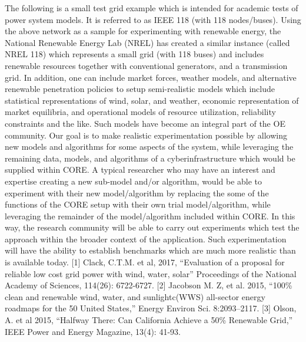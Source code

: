 The following is a small test grid example which is intended for academic tests of power system models. It is referred to as IEEE 118 (with 118 nodes/buses). Using the above network as a sample for experimenting with renewable energy, the National Renewable Energy Lab (NREL) has created a similar instance (called NREL 118) which represents a small grid (with 118 buses) and includes renewable resources together with conventional generators, and a transmission grid.  In addition, one can include market forces, weather models, and alternative renewable penetration policies to setup semi-realistic models which include statistical representations of wind, solar, and weather, economic representation of market equilibria, and operational models of resource utilization, reliability constraints and the like.  Such models have become an integral part of the OE community.  Our goal is to make realistic experimentation possible by allowing new models and algorithms for some aspects of the system, while leveraging the remaining data, models, and algorithms of a cyberinfrastructure which would be supplied within CORE.   A typical researcher who may  have an interest and expertise creating a new sub-model and/or algorithm, would be able to experiment with their new model/algorithm  by replacing the some of the functions of the CORE setup with their own trial  model/algorithm, while leveraging the remainder of the model/algorithm included within CORE.  In this way, the research community will be able to carry out experiments which test the approach within the broader context of the application.  Such experimentation will have the ability to establish benchmarks which are much more realistic than is available today. 
[1]	Clack, C.T.M. et al, 2017, “Evaluation of a proposal for reliable low cost grid power with wind, water, solar” Proceedings of the National Academy of Sciences, 114(26): 6722-6727.
[2]	Jacobson M. Z, et al. 2015, “100\% clean and renewable wind, water, and sunlightc(WWS) all-sector energy roadmaps for the 50 United States,”  Energy Environ Sci. 8:2093–2117.
[3]	Olson, A. et al 2015, “Halfway There:  Can California Achieve a 50\% Renewable Grid,” IEEE Power and Energy Magazine, 13(4): 41-93.


